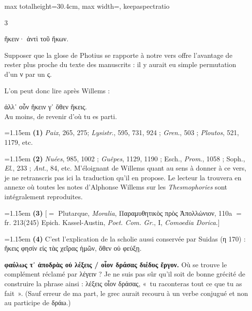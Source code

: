 \documentclass[11pt,twoside]{book}
\newcommand{\italique}[1]{\textit{#1}}
\newcommand{\citComm}[1]{\begin{quoting}[vskip=0.4pt,leftmargin=0.7em,rightmargin=0.2em]#1\end{quoting}}
\newcommand{\francais}[1]{{\policeFr #1}}
\begin{document}
\begin{adjustbox}{max totalheight=30.4cm, max width=\textwidth, keepaspectratio}
\begin{minipage}{\textwidth}
{\begin{multicols}{3}
\citComm{ἥκειν· ἀντὶ τοῦ ἥκων.}
\par\vspace{1.5pt}
\noindent Supposer que la glose de Photius se rapporte à notre vers offre l'avantage de rester plus proche du texte des manuscrits : il y aurait eu simple permutation d'un ν par un ς.
\par\vspace{1.5pt}
\noindent L'on peut donc lire après Willems :
\citComm{ἀλλ᾽ οὖν ἥκειν γ᾽ ὅθεν ἥκεις.\\
\francais{Au moins, de revenir d'où tu es parti.}}
\par\vspace{1.5pt}
\par\vspace{1.2pt}\par\nopagebreak\vspace{1pt}\noindent\hangindent=1.15em {\color{sepiaNote}\textbf{(1)}} \italique{Paix}, 265, 275; \italique{Lysistr}., 595, 731, 924 ; \italique{Gren}., 503 ; \italique{Ploutos}, 521, 1179, etc.
\par\vspace{1.5pt}
\noindent\hangindent=1.15em {\color{sepiaNote}\textbf{(2)}} \italique{Nuées}, 985, 1002 ; \italique{Guêpes}, 1129, 1190 ; Esch., \italique{Prom}., 1058 ; Soph., \italique{El}., 233 ; \italique{Ant}., 84, etc. M'éloignant de Willems quant au sens à donner à ce vers, je ne retranscris pas ici la traduction qu'il en propose. Le lecteur la trouvera en annexe où toutes les notes d'Alphonse Willems sur les \italique{Thesmophories} sont intégralement reproduites.
\par\vspace{1.5pt}
\noindent\hangindent=1.15em {\color{sepiaNote}\textbf{(3)}} $[=$ Plutarque, \italique{Moralia}, Παραμυθητικὸς πρὸς Ἀπολλώνιον, 110a $=$ fr. 213(245) Epich. Kassel-Austin, \italique{Poet. Com. Gr.}, I, \italique{Comoedia Dorica}.$]$
\par\vspace{1.5pt}
\noindent\hangindent=1.15em {\color{sepiaNote}\textbf{(4)}} C'est l'explication de la scholie aussi conservée par Suidas (η 170) : ἥκεις φησίν εἰς τὰς χεῖρας ἡμῶν, ὅθεν οὐ φεύξῃ.
\par\vspace{1.5pt}
 \textbf{φαύλως τ᾽ ἀποδρὰς οὐ λέξεις / οἷον δράσας διέδυς ἔργον.} Où se trouve le complément réclamé par λέγειν ? Je ne suis pas sûr qu'il soit de bonne grécité de construire la phrase ainsi  : λέξεις οἷον δράσας, «~tu raconteras tout ce que tu as fait~». (Sauf erreur de ma part, le grec aurait recouru à un verbe conjugué et non au participe de δράω.)

\end{multicols}}
\end{minipage}
\end{adjustbox}
\end{document}
